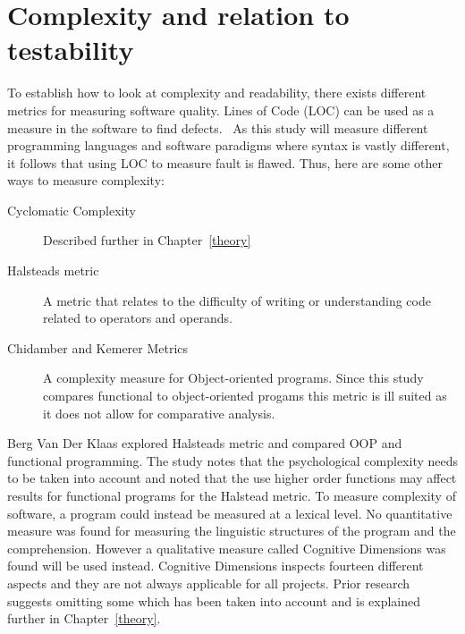 \section{Complexity and relation to testability}

To establish how to look at complexity and readability, there exists different
metrics for measuring software quality. Lines of Code (LOC) can be used as a
measure in the software to find defects.~\cite{defectloc} As this study will
measure different programming languages and software paradigms where syntax is
vastly different, it follows that using LOC to measure fault is flawed. Thus,
here are some other ways to measure complexity:

\begin{description}

    \item [Cyclomatic Complexity] Described further in Chapter~\ref{theory}

    \item [Halsteads metric] A metric that relates to the difficulty of writing
    or understanding code related to operators and operands.~\cite{bergklaas}

    \item [Chidamber and Kemerer Metrics~\cite{chidamber}] A complexity measure
    for Object-oriented programs. Since this study compares functional to
    object-oriented progams this metric is ill suited as it does not allow for
    comparative analysis.

\end{description}

Berg Van Der Klaas explored Halsteads metric and compared OOP and functional
programming. The study notes that the psychological complexity needs to be taken
into account and noted that the use higher order functions may affect results
for functional programs for the Halstead metric. To measure complexity of
software, a program could instead be measured at a lexical level. No
quantitative measure was found for measuring the linguistic structures of the
program and the comprehension. However a qualitative measure called Cognitive
Dimensions was found will be used instead.  Cognitive Dimensions inspects
fourteen different aspects and they are not always applicable for all projects.
Prior research suggests omitting some which has been taken into account and is
explained further in Chapter~\ref{theory}.~\cite{euguenkiss}

